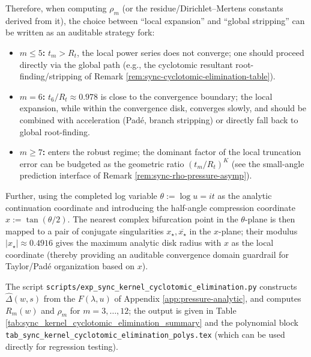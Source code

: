 \begin{remark}[True analytic radius: the nearest complex bifurcation point pins down the convergence disk at \texorpdfstring{$t=0$}{t=0}]
\par
Therefore, when computing \(\rho_m\) (or the residue/Dirichlet--Mertens constants derived from it), the choice between ``local expansion'' and ``global stripping'' can be written as an auditable strategy fork:
\begin{itemize}
  \item \textbf{\(m\le 5\):} \(t_m>R_t\), the local power series does not converge; one should proceed directly via the global path (e.g., the cyclotomic resultant root-finding/stripping of Remark \ref{rem:sync-cyclotomic-elimination-table}).
  \item \textbf{\(m=6\):} \(t_6/R_t\approx 0.978\) is close to the convergence boundary; the local expansion, while within the convergence disk, converges slowly, and should be combined with acceleration (Pad\'e, branch stripping) or directly fall back to global root-finding.
  \item \textbf{\(m\ge 7\):} enters the robust regime; the dominant factor of the local truncation error can be budgeted as the geometric ratio \((t_m/R_t)^K\) (see the small-angle prediction interface of Remark \ref{rem:sync-rho-pressure-asymp}).
 \end{itemize}

\par
Further, using the completed log variable \(\theta:=\log u=it\) as the analytic continuation coordinate and introducing the half-angle compression coordinate
\(
x:=\tan(\theta/2)
\).
The nearest complex bifurcation point in the \(\theta\)-plane is then mapped to a pair of conjugate singularities \(x_\star,\overline{x_\star}\) in the \(x\)-plane; their modulus \(|x_\star|\approx 0.4916\) gives the maximum analytic disk radius with \(x\) as the local coordinate (thereby providing an auditable convergence domain guardrail for Taylor/Pad\'e organization based on \(x\)).

\end{remark}

\begin{remark}[Reproducible output: \texorpdfstring{$R_m$}{Rm} and \texorpdfstring{$\rho_m$}{rhom} for \texorpdfstring{$m=3,\dots,12$}{m=3..12}]\label{rem:sync-cyclotomic-elimination-table}
The script \texttt{scripts/exp\_sync\_kernel\_cyclotomic\_elimination.py} constructs $\widehat{\Delta}(w,s)$ from the $F(\lambda,u)$ of Appendix \ref{app:pressure-analytic}, and computes $R_m(w)$ and $\rho_m$ for $m=3,\dots,12$; the output is given in Table \ref{tab:sync_kernel_cyclotomic_elimination_summary} and the polynomial block \texttt{tab\_sync\_kernel\_cyclotomic\_elimination\_polys.tex} (which can be used directly for regression testing).
\end{remark}

